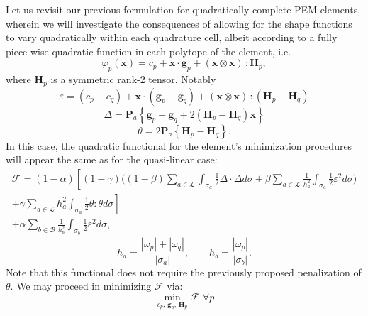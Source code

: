 \documentclass[11pt]{article} %
\begin{document}
Let us revisit our previous formulation for quadratically complete PEM elements, wherein we will investigate the consequences of allowing for the shape functions to vary quadratically within each quadrature cell, albeit according to a fully piece-wise quadratic function in each polytope of the element, i.e.
\begin{equation}
	\varphi_p (\mathbf{x}) = c_p + \mathbf{x} \cdot \mathbf{g}_p + (\mathbf{x} \otimes \mathbf{x}) \, \colon \mathbf{H}_{p},
\end{equation}
where $\mathbf{H}_{p}$ is a symmetric rank-2 tensor. Notably
\begin{equation}
	\varepsilon = (c_p - c_q) + \mathbf{x} \cdot (\mathbf{g}_p - \mathbf{g}_q) + (\mathbf{x} \otimes \mathbf{x}) \, \colon (\mathbf{H}_{p} - \mathbf{H}_{q})
\end{equation}
\begin{equation}
	\Delta = \mathbf{P}_a \left\{ \mathbf{g}_p - \mathbf{g}_q + 2 (\mathbf{H}_p - \mathbf{H}_q) \mathbf{x} \right\}
\end{equation}
\begin{equation}
	\theta = 2 \mathbf{P}_a \left\{ \mathbf{H}_p - \mathbf{H}_q \right\} .
\end{equation}
In this case, the quadratic functional for the element's minimization procedures will appear the same as for the quasi-linear case:
\begin{eqnarray}
	\mathcal{F} = (1-\alpha) \left[ (1 - \gamma) \bigg( (1-\beta) \sum_{a \in \mathcal{L}} \int_{\sigma_a} \frac{1}{2} \Delta \cdot \Delta d \sigma + \beta \sum_{a \in \mathcal{L}} \frac{1}{h_a^2} \int_{\sigma_a} \frac{1}{2} \varepsilon^2 d \sigma \bigg) \right. \nonumber \\ + \left. \gamma \sum_{a \in \mathcal{L}} h_a^2 \int_{\sigma_a} \frac{1}{2} \theta \colon \theta d \sigma \right] \nonumber \\ + \alpha \sum_{b \in \mathcal{B}} \frac{1}{h_b^2} \int_{\sigma_b} \frac{1}{2} \varepsilon^2 d \sigma ,
\end{eqnarray}
\begin{equation}
	h_a = \frac{| \omega_p | + | \omega_q |}{| \sigma_a |}, \qquad h_b = \frac{| \omega_p |}{| \sigma_b |}.
\end{equation}
Note that this functional does not require the previously proposed penalization of $\theta$. We may proceed in minimizing $\mathcal{F}$ via:
\begin{equation}
	\min_{c_p, \, \mathbf{g}_p, \, \mathbf{H}_{p}} \mathcal{F} \, \, \forall p
\end{equation}
\end{document}
